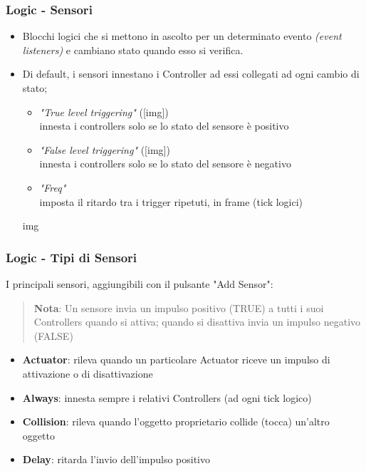 \documentclass{beamer}
\begin{document}
		\begin{frame}		%
			\frametitle{Logic - Sensori}
			\begin{itemize}
				\item Blocchi logici che \textcolor{BlenderOrange}{si mettono in ascolto} per un determinato evento \textit{(event listeners)} e \textcolor{BlenderOrange}{cambiano stato }quando esso si verifica.
				\item Di default, i sensori \textcolor{BlenderOrange}{innestano i Controller} ad essi collegati ad ogni cambio di stato;
				\begin{itemize}
					\item \textit{"True level triggering"} ([img]) \\ {\footnotesize\hspace{1em} innesta i controllers solo se lo stato del sensore è positivo}
					\item \textit{"False level triggering"} ([img]) \\ {\footnotesize\hspace{1em}innesta i controllers solo se lo stato del sensore è negativo}
					\item \textit{"Freq"} \\ {\footnotesize\hspace{1em}imposta il ritardo tra i trigger ripetuti, in frame (tick logici)}
				\end{itemize}
				\item [img]
			\end{itemize}
		\end{frame}		
		\begin{frame}
			\frametitle{Logic - Tipi di Sensori}
			I principali sensori, aggiungibili con il pulsante "Add Sensor":\\
			\begin{quote}
			\textcolor{BlenderOrange}{\textbf{Nota}: Un sensore invia un impulso positivo (TRUE) a tutti i suoi Controllers quando si attiva; quando si disattiva invia un impulso negativo (FALSE)}
			\end{quote}
						
			\begin{itemize}
				\item \textbf{Actuator}: rileva quando un particolare Actuator riceve un impulso di attivazione o di disattivazione
				\item \textbf{Always}: innesta sempre i relativi Controllers (ad ogni tick logico)
				\item \textbf{Collision}: rileva quando l'oggetto proprietario collide (tocca) un'altro oggetto
				\item \textbf{Delay}: ritarda l'invio dell'impulso positivo
			\end{itemize}
		\end{frame}	
\end{document}
